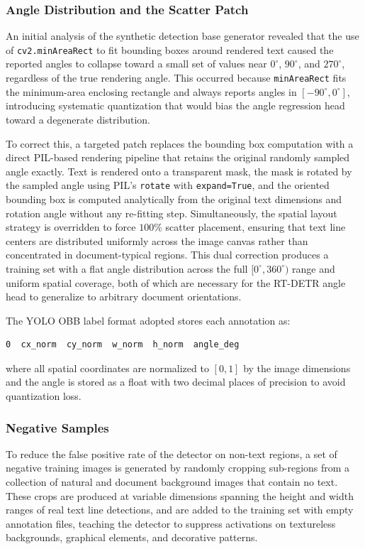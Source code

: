 \subsubsection{Angle Distribution and the Scatter Patch}
An initial analysis of the synthetic detection base generator revealed that the use of \texttt{cv2.minAreaRect} to fit bounding boxes around rendered text caused the reported angles to collapse toward a small set of values near $0^\circ$, $90^\circ$, and $270^\circ$, regardless of the true rendering angle. This occurred because \texttt{minAreaRect} fits the minimum-area enclosing rectangle and always reports angles in $[-90^\circ, 0^\circ]$, introducing systematic quantization that would bias the angle regression head toward a degenerate distribution.

To correct this, a targeted patch replaces the bounding box computation with a direct PIL-based rendering pipeline that retains the original randomly sampled angle exactly. Text is rendered onto a transparent mask, the mask is rotated by the sampled angle using PIL's \texttt{rotate} with \texttt{expand=True}, and the oriented bounding box is computed analytically from the original text dimensions and rotation angle without any re-fitting step. Simultaneously, the spatial layout strategy is overridden to force $100\%$ scatter placement, ensuring that text line centers are distributed uniformly across the image canvas rather than concentrated in document-typical regions. This dual correction produces a training set with a flat angle distribution across the full $[0^\circ, 360^\circ)$ range and uniform spatial coverage, both of which are necessary for the RT-DETR angle head to generalize to arbitrary document orientations.

The YOLO OBB label format adopted stores each annotation as:
\begin{verbatim}
0  cx_norm  cy_norm  w_norm  h_norm  angle_deg
\end{verbatim}
where all spatial coordinates are normalized to $[0, 1]$ by the image dimensions and the angle is stored as a float with two decimal places of precision to avoid quantization loss.

\subsubsection{Negative Samples}
To reduce the false positive rate of the detector on non-text regions, a set of negative training images is generated by randomly cropping sub-regions from a collection of natural and document background images that contain no text. These crops are produced at variable dimensions spanning the height and width ranges of real text line detections, and are added to the training set with empty annotation files, teaching the detector to suppress activations on textureless backgrounds, graphical elements, and decorative patterns.

